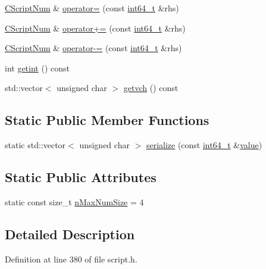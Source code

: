 \begin{DoxyCompactItemize}
\item 
\hyperlink{class_c_script_num}{C\+Script\+Num} \& \hyperlink{class_c_script_num_ace45ef712f5b771114c019e95b24b3be}{operator=} (const \hyperlink{stdint_8h_adec1df1b8b51cb32b77e5b86fff46471}{int64\+\_\+t} \&rhs)
\item 
\hyperlink{class_c_script_num}{C\+Script\+Num} \& \hyperlink{class_c_script_num_a75a2fce922fed2ef4433d4e9fba6f85c}{operator+=} (const \hyperlink{stdint_8h_adec1df1b8b51cb32b77e5b86fff46471}{int64\+\_\+t} \&rhs)
\item 
\hyperlink{class_c_script_num}{C\+Script\+Num} \& \hyperlink{class_c_script_num_af83fa61859f58965e26fad7b4c82cc0d}{operator-\/=} (const \hyperlink{stdint_8h_adec1df1b8b51cb32b77e5b86fff46471}{int64\+\_\+t} \&rhs)
\item 
int \hyperlink{class_c_script_num_ab58edf8d8c555acbcac9e1ff9827a8da}{getint} () const 
\item 
std\+::vector$<$ unsigned char $>$ \hyperlink{class_c_script_num_aaa803c18a86acc8b928054f052dcc4c4}{getvch} () const 
\end{DoxyCompactItemize}
\subsection*{Static Public Member Functions}
\begin{DoxyCompactItemize}
\item 
static std\+::vector$<$ unsigned char $>$ \hyperlink{class_c_script_num_a2e2c60f2646f03b5cec8d92a6d31b1e8}{serialize} (const \hyperlink{stdint_8h_adec1df1b8b51cb32b77e5b86fff46471}{int64\+\_\+t} \&\hyperlink{cache_8cc_a0f61d63b009d0880a89c843bd50d8d76}{value})
\end{DoxyCompactItemize}
\subsection*{Static Public Attributes}
\begin{DoxyCompactItemize}
\item 
static const size\+\_\+t \hyperlink{class_c_script_num_a50a64fe3041a47f7d87d64d4533b5431}{n\+Max\+Num\+Size} = 4
\end{DoxyCompactItemize}


\subsection{Detailed Description}


Definition at line 380 of file script.\+h.



